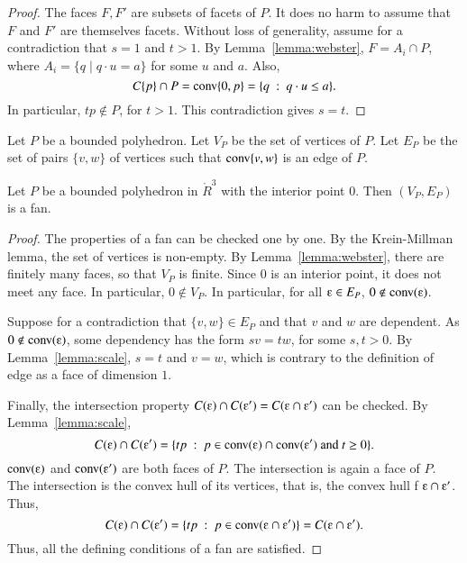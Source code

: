 \begin{proof}  The faces $F,F'$ are subsets of facets of $P$.  It does no harm to assume that $F$ and $F'$ are themselves facets.   Without loss of generality, assume for a contradiction that $s=1$ and $t>1$.  By Lemma~\ref{lemma:webster}, 
 $F = A_i \cap P$, where $A_i = \{q \mid q\cdot u = a\}$ for some $u$ and $a$.  Also, 
$$
C\{p\}\cap P = {\operatorname{conv}}\{0,p\} = \{q \ :\  q\cdot u \le a\}.
$$
In particular, $t p\not\in P$, for $t>1$.  This contradiction gives $s = t$.
\end{proof}





\begin{definition} Let $P$ be a bounded polyhedron.
Let $V_P$ be the set of vertices of $P$.  Let $E_P$ be the set of pairs $\{v,w\}$ of vertices such that ${\operatorname{conv}}\{v,w\}$ is an edge of $P$.
\end{definition}

\begin{lemma}\label{lemma:polyhedron}%
Let $P$ be a bounded polyhedron in $\ring{R}^3$ with the interior point $0$.
Then $(V_P,E_P)$ is a fan.
\end{lemma}

\begin{proof} The properties of a fan can be checked one by one.
By the Krein-Millman lemma, the set of vertices is non-empty.  By Lemma~\ref{lemma:webster}, there are finitely many faces, so that $V_P$ is finite.  Since $0$ is an interior point, it does not meet any face.  In particular, $0\not\in V_P$.   In particular,
for all $\e\in E_P$, 
$0\not\in \op{conv}(\e)$.

Suppose for a contradiction that $\{v,w\}\in E_P$ and that $v$ and $w$ are dependent.  As $0\not\in \op{conv}(\e)$, some dependency has the form $s v = t w$, for some $s, t>0$.  By Lemma~\ref{lemma:scale}, $s=t$ and $v=w$, which is contrary to the definition of edge as a face of dimension $1$.

Finally, the intersection property $C(\e)\cap C(\e') = C(\e \cap \e')$ can be checked.
By Lemma~\ref{lemma:scale},
$$
C(\e) \cap C(\e') = \{t p \mid p\in \op{conv}(\e) \cap \op{conv}(\e') \text{ and } t \ge 0\}.
$$
$\op{conv}(\e)$ and $\op{conv}(\e')$ are both faces of $P$.  The intersection is again a face of $P$.  The intersection is the convex hull of its vertices, that is, the convex hull f $\e \cap \e'$.  Thus,
$$
C(\e)\cap C(\e') = \{t p \mid p\in \op{conv}(\e\cap \e')\} = C(\e \cap \e').
$$
Thus, all the defining conditions of a fan are satisfied.
\end{proof}


